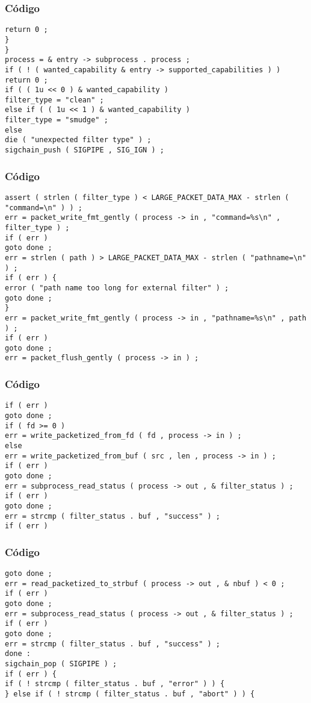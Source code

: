 \documentclass{beamer}
\begin{document}
\begin{frame}[fragile]
\frametitle{C\'odigo}
\begin{verbatim}
return 0 ; 
} 
} 
process = & entry -> subprocess . process ; 
if ( ! ( wanted_capability & entry -> supported_capabilities ) ) 
return 0 ; 
if ( ( 1u << 0 ) & wanted_capability ) 
filter_type = "clean" ; 
else if ( ( 1u << 1 ) & wanted_capability ) 
filter_type = "smudge" ; 
else 
die ( "unexpected filter type" ) ; 
sigchain_push ( SIGPIPE , SIG_IGN ) ; 
\end{verbatim}
\end{frame}
\begin{frame}[fragile]
\frametitle{C\'odigo}
\begin{verbatim}
assert ( strlen ( filter_type ) < LARGE_PACKET_DATA_MAX - strlen ( "command=\n" ) ) ; 
err = packet_write_fmt_gently ( process -> in , "command=%s\n" , filter_type ) ; 
if ( err ) 
goto done ; 
err = strlen ( path ) > LARGE_PACKET_DATA_MAX - strlen ( "pathname=\n" ) ; 
if ( err ) { 
error ( "path name too long for external filter" ) ; 
goto done ; 
} 
err = packet_write_fmt_gently ( process -> in , "pathname=%s\n" , path ) ; 
if ( err ) 
goto done ; 
err = packet_flush_gently ( process -> in ) ; 
\end{verbatim}
\end{frame}
\begin{frame}[fragile]
\frametitle{C\'odigo}
\begin{verbatim}
if ( err ) 
goto done ; 
if ( fd >= 0 ) 
err = write_packetized_from_fd ( fd , process -> in ) ; 
else 
err = write_packetized_from_buf ( src , len , process -> in ) ; 
if ( err ) 
goto done ; 
err = subprocess_read_status ( process -> out , & filter_status ) ; 
if ( err ) 
goto done ; 
err = strcmp ( filter_status . buf , "success" ) ; 
if ( err ) 
\end{verbatim}
\end{frame}
\begin{frame}[fragile]
\frametitle{C\'odigo}
\begin{verbatim}
goto done ; 
err = read_packetized_to_strbuf ( process -> out , & nbuf ) < 0 ; 
if ( err ) 
goto done ; 
err = subprocess_read_status ( process -> out , & filter_status ) ; 
if ( err ) 
goto done ; 
err = strcmp ( filter_status . buf , "success" ) ; 
done : 
sigchain_pop ( SIGPIPE ) ; 
if ( err ) { 
if ( ! strcmp ( filter_status . buf , "error" ) ) { 
} else if ( ! strcmp ( filter_status . buf , "abort" ) ) { 
\end{verbatim}
\end{frame}
\end{document}
